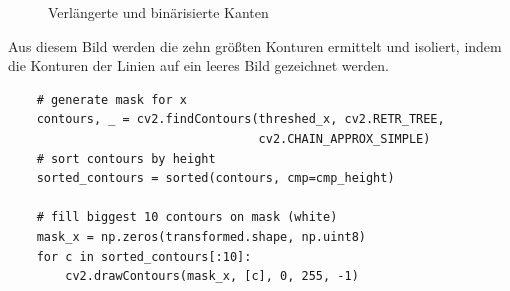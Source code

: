 \begin{figure}[H]
    \hfill
    \caption{Verlängerte und binärisierte Kanten}
\end{figure}

Aus diesem Bild werden die zehn größten Konturen ermittelt und isoliert, indem die Konturen der Linien auf ein leeres Bild gezeichnet werden.

\begin{lstlisting}
    # generate mask for x
    contours, _ = cv2.findContours(threshed_x, cv2.RETR_TREE,
                                   cv2.CHAIN_APPROX_SIMPLE)
    # sort contours by height
    sorted_contours = sorted(contours, cmp=cmp_height)

    # fill biggest 10 contours on mask (white)
    mask_x = np.zeros(transformed.shape, np.uint8)
    for c in sorted_contours[:10]:
        cv2.drawContours(mask_x, [c], 0, 255, -1)
\end{lstlisting}

